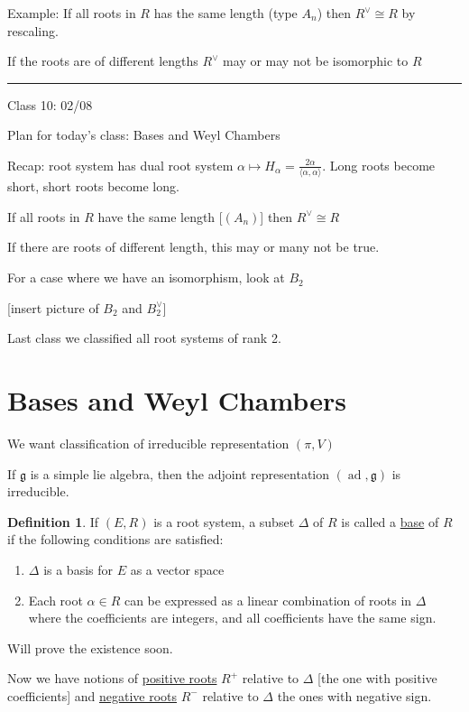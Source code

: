 \documentclass{article}
\theoremstyle{definition}
\newtheorem{definition}{Definition}
\newcommand{\ad}{\operatorname{ad}}
\begin{document}
Example: If all roots in \(R\) has the same length (type \(A_n\)) then \(R^\vee\cong R\) by rescaling.

If the roots are of different lengths \(R^\vee\) may or may not be isomorphic to \(R\)

\hfil
\hrule

Class 10: 02/08

Plan for today's class: Bases and Weyl Chambers

Recap: root system has dual root system \(\alpha \mapsto H_\alpha = \frac{2\alpha }{\langle \alpha ,\alpha  \rangle }\). Long roots become short, short roots become long.

If all roots in \(R\) have the same length [\((A_n)\)] then \(R^\vee \cong R\)

If there are roots of different length, this may or many not be true.

For a case where we have an isomorphism, look at \(B_2\)

[insert picture of \(B_2\) and \(B_2^\vee\)]

Last class we classified all root systems of rank 2.

\section*{Bases and Weyl Chambers}

We want classification of irreducible representation \((\pi,V)\) 

If \(\mathfrak{g}\) is a simple lie algebra, then the adjoint representation \((\ad,\mathfrak{g})\) is irreducible.

\begin{definition}
    If \((E,R)\) is a root system, a subset \(\Delta\) of \(R\) is called a \underline{base} of \(R\) if the following conditions are satisfied:

    \begin{enumerate}
        \item \(\Delta\) is a basis for \(E\) as a vector space
        \item Each root \(\alpha\in R\) can be expressed as a linear combination of roots in \(\Delta\) where the coefficients are integers, and all coefficients have the same sign.
    \end{enumerate}

\end{definition}

Will prove the existence soon.

Now we have notions of \underline{positive roots} \(R^+\) relative to \(\Delta\) [the one with positive coefficients] and \underline{negative roots} \(R^-\)  relative to \(\Delta\) the ones with negative sign.
\end{document}
